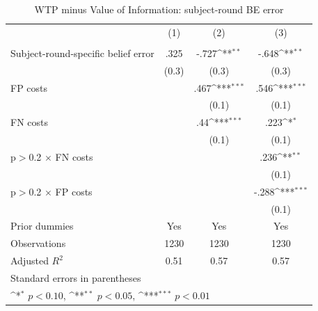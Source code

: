 \begin{table}[htbp]\centering
\def\sym#1{\ifmmode^{#1}\else\(^{#1}\)\fi}
\caption{WTP minus Value of Information: subject-round BE error}
\begin{tabular}{l*{3}{c}}
\hline\hline
                &\multicolumn{1}{c}{(1)}&\multicolumn{1}{c}{(2)}&\multicolumn{1}{c}{(3)}\\
                &\multicolumn{1}{c}{}&\multicolumn{1}{c}{}&\multicolumn{1}{c}{}\\
\hline
Subject-round-specific belief error&     .325         &    -.727\sym{**} &    -.648\sym{**} \\
                &    (0.3)         &    (0.3)         &    (0.3)         \\
FP costs        &                  &     .467\sym{***}&     .546\sym{***}\\
                &                  &    (0.1)         &    (0.1)         \\
FN costs        &                  &      .44\sym{***}&     .223\sym{*}  \\
                &                  &    (0.1)         &    (0.1)         \\
p$>$0.2 $\times$ FN costs&                  &                  &     .236\sym{**} \\
                &                  &                  &    (0.1)         \\
p$>$0.2 $\times$ FP costs&                  &                  &    -.288\sym{***}\\
                &                  &                  &    (0.1)         \\
Prior dummies   &      Yes         &      Yes         &      Yes         \\
\hline
Observations    &     1230         &     1230         &     1230         \\
Adjusted \(R^{2}\)&     0.51         &     0.57         &     0.57         \\
\hline\hline
\multicolumn{4}{l}{\footnotesize Standard errors in parentheses}\\
\multicolumn{4}{l}{\footnotesize \sym{*} \(p<0.10\), \sym{**} \(p<0.05\), \sym{***} \(p<0.01\)}\\
\end{tabular}
\end{table}
